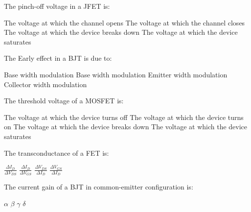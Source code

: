 \begin{question}[2]
The pinch-off voltage in a JFET is:

\begin{oneparcheckboxes}
\choice The voltage at which the channel opens
\correctchoice The voltage at which the channel closes
\choice The voltage at which the device breaks down
\choice The voltage at which the device saturates
\end{oneparcheckboxes}
\end{question}

\begin{question}[2]
The Early effect in a BJT is due to:

\begin{oneparcheckboxes}
\choice Base width modulation
\correctchoice Base width modulation
\choice Emitter width modulation
\choice Collector width modulation
\end{oneparcheckboxes}
\end{question}

\begin{question}[2]
The threshold voltage of a MOSFET is:

\begin{oneparcheckboxes}
\choice The voltage at which the device turns off
\correctchoice The voltage at which the device turns on
\choice The voltage at which the device breaks down
\choice The voltage at which the device saturates
\end{oneparcheckboxes}
\end{question}

\begin{question}[2]
The transconductance of a FET is:

\begin{oneparcheckboxes}
\choice $\displaystyle \frac{\Delta I_D}{\Delta V_{DS}}$
\correctchoice $\displaystyle \frac{\Delta I_D}{\Delta V_{GS}}$
\choice $\displaystyle \frac{\Delta V_{DS}}{\Delta I_D}$
\choice $\displaystyle \frac{\Delta V_{GS}}{\Delta I_D}$
\end{oneparcheckboxes}
\end{question}

\begin{question}[2]
The current gain of a BJT in common-emitter configuration is:

\begin{oneparcheckboxes}
\choice $\displaystyle \alpha$
\correctchoice $\displaystyle \beta$
\choice $\displaystyle \gamma$
\choice $\displaystyle \delta$
\end{oneparcheckboxes}
\end{question}

